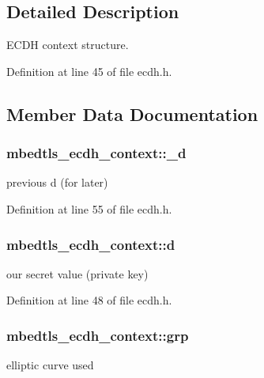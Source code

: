 \subsection{Detailed Description}
E\-C\-D\-H context structure. 

Definition at line 45 of file ecdh.\-h.



\subsection{Member Data Documentation}
\hypertarget{structmbedtls__ecdh__context_af5412a43eb79b11a6cc13c3a9af55e13}{
\subsubsection[{\-\_\-d}]{ mbedtls\-\_\-ecdh\-\_\-context\-::\-\_\-d}}\label{structmbedtls__ecdh__context_af5412a43eb79b11a6cc13c3a9af55e13}
previous d (for later) 

Definition at line 55 of file ecdh.\-h.

\hypertarget{structmbedtls__ecdh__context_a22e51b2ea7d4728e48e8897535831cf4}{
\subsubsection[{d}]{ mbedtls\-\_\-ecdh\-\_\-context\-::d}}\label{structmbedtls__ecdh__context_a22e51b2ea7d4728e48e8897535831cf4}
our secret value (private key) 

Definition at line 48 of file ecdh.\-h.

\hypertarget{structmbedtls__ecdh__context_a9fd1b03576203de87a92a2d49a4d20ed}{
\subsubsection[{grp}]{ mbedtls\-\_\-ecdh\-\_\-context\-::grp}}\label{structmbedtls__ecdh__context_a9fd1b03576203de87a92a2d49a4d20ed}
elliptic curve used 

